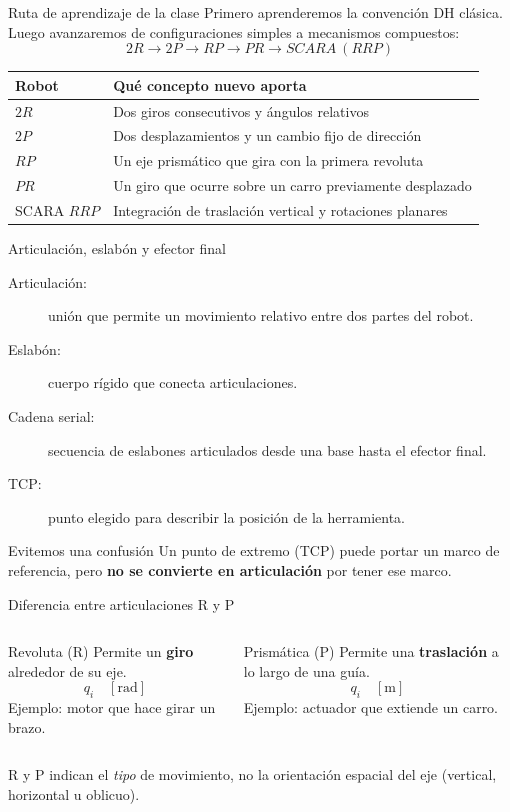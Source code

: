 \documentclass[aspectratio=169,11pt]{beamer}
\begin{document}
\begin{frame}[t]{Ruta de aprendizaje de la clase}
 \small
 Primero aprenderemos la convención DH clásica. Luego avanzaremos
 de configuraciones simples a mecanismos compuestos:
 \[
 \boxed{2R\longrightarrow2P\longrightarrow RP
 \longrightarrow PR\longrightarrow SCARA\ (RRP)}
 \]
 \pause
 \begin{tabular}{ll}
 \toprule
 Robot & Qué concepto nuevo aporta\\\midrule
 $2R$ & Dos giros consecutivos y ángulos relativos\\
 $2P$ & Dos desplazamientos y un cambio fijo de dirección\\
 $RP$ & Un eje prismático que gira con la primera revoluta\\
 $PR$ & Un giro que ocurre sobre un carro previamente desplazado\\
 SCARA $RRP$ & Integración de traslación vertical y rotaciones planares\\
 \bottomrule
 \end{tabular}
\end{frame}

\begin{frame}[t]{Articulación, eslabón y efector final}
 \small
 \begin{description}
 \item[Articulación:] unión que permite un movimiento relativo
 entre dos partes del robot.
 \item[Eslabón:] cuerpo rígido que conecta articulaciones.
 \item[Cadena serial:] secuencia de eslabones articulados desde una base
 hasta el efector final.
 \item[TCP:] punto elegido para describir la posición de la herramienta.
 \end{description}
 \pause
 \begin{alertblock}{Evitemos una confusión}
 Un punto de extremo (TCP) puede portar un marco de referencia,
 pero \textbf{no se convierte en articulación} por tener ese marco.
 \end{alertblock}
\end{frame}

\begin{frame}[t]{Diferencia entre articulaciones R y P}
 \begin{columns}[T,onlytextwidth]
 \begin{block}{Revoluta (R)}
  \small Permite un \textbf{giro} alrededor de su eje.
  \[q_i\quad[\mathrm{rad}]\]
  Ejemplo: motor que hace girar un brazo.
 \end{block}
 \begin{block}{Prismática (P)}
  \small Permite una \textbf{traslación} a lo largo de una guía.
  \[q_i\quad[\mathrm{m}]\]
  Ejemplo: actuador que extiende un carro.
 \end{block}
 \end{columns}
 \pause
 \vspace{0.25cm}
 \centering\small
 R y P indican el \emph{tipo} de movimiento, no la orientación
 espacial del eje (vertical, horizontal u oblicuo).
\end{frame}
\end{document}
